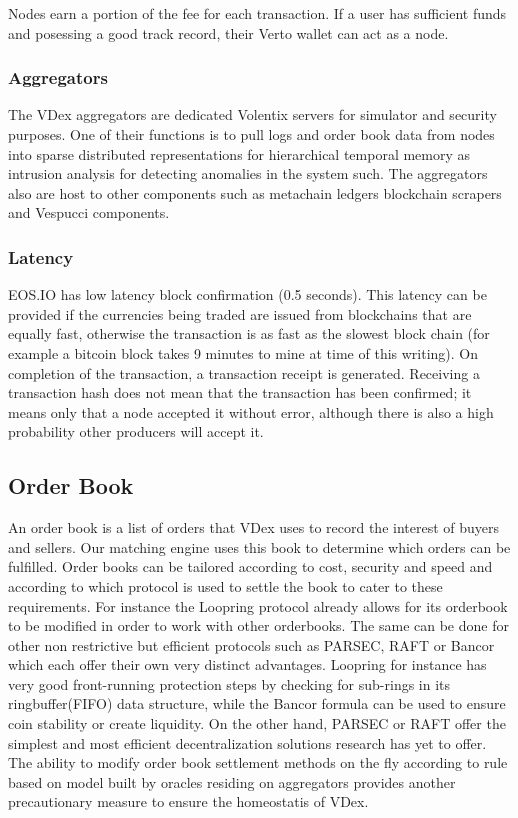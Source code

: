 \documentclass[]{article}
\begin{document}
{Nodes earn a portion of the fee for each transaction.
If a user has sufficient funds and posessing a good track record, their Verto wallet can act as a node.
	
	\subsubsection{Aggregators}
	
	The VDex aggregators are dedicated Volentix servers for simulator and security purposes. 
	One of their functions is to pull logs and order book data from nodes into sparse distributed representations for hierarchical temporal memory as intrusion \cite{24} analysis for detecting anomalies in the system such. The aggregators also are host to other components such as metachain ledgers\cite{20} blockchain scrapers and Vespucci components.
	 
	
	\subsubsection{Latency}	
	EOS.IO has low latency block confirmation (0.5 seconds).\cite{3}
	This latency can be provided if the currencies being traded are issued from blockchains that are equally fast, otherwise the transaction is as fast as the slowest block chain
	(for example a bitcoin block takes 9 minutes to mine at time of this writing). 
	On completion of the transaction, a transaction receipt is generated. 
	Receiving a transaction hash does not mean that the transaction has been confirmed; it means only that a node accepted it without error, although there is also a high probability other producers will accept it. 

\subsection{Order Book}
An order book is a list of orders that VDex uses to record the interest of buyers and sellers. Our matching engine uses this book to determine which orders can be fulfilled.
Order books can be tailored according to cost, security and speed and according to which protocol is used to settle the book to cater to these requirements. For instance the Loopring protocol already allows for its orderbook to be modified in order to work with other orderbooks.\cite{7} The same can be done for other non restrictive but efficient protocols such as PARSEC, RAFT or Bancor which each offer their own very distinct advantages. Loopring for instance has very good front-running protection steps by checking for sub-rings in its ringbuffer(FIFO) data structure, while the Bancor formula can be used to ensure coin stability or create liquidity. On the other hand, PARSEC or RAFT offer the simplest and most efficient decentralization solutions research has yet to offer.
The ability to modify order book settlement methods on the fly according to rule based on model built by oracles residing on aggregators provides another precautionary measure to ensure the homeostatis of VDex.
  
}
\end{document}
